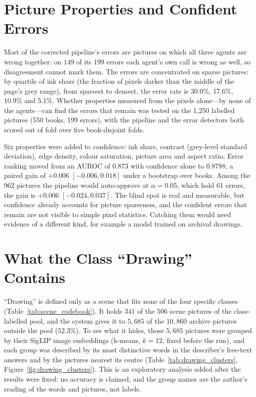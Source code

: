 \section{Picture Properties and Confident Errors}
\label{sec:blind_spot_features}

Most of the corrected pipeline's errors are pictures on which all three agents are wrong together: on $149$ of its $199$ errors each agent's own call is wrong as well, so disagreement cannot mark them. The errors are concentrated on sparse pictures: by quartile of ink share (the fraction of pixels darker than the middle of the page's grey range), from sparsest to densest, the error rate is 30.0\%, 17.6\%, 10.9\% and 5.1\%. Whether properties measured from the pixels alone---by none of the agents---can find the errors that remain was tested on the 1,250 labelled pictures (550 books, 199 errors), with the pipeline and the error detectors both scored out of fold over five book-disjoint folds.

Six properties were added to confidence: ink share, contrast (grey-level standard deviation), edge density, colour saturation, picture area and aspect ratio. Error ranking moved from an AUROC of $0.873$ with confidence alone to $0.8788$, a paired gain of $+0.006$ $[-0.006, 0.018]$ under a bootstrap over books. Among the 962 pictures the pipeline would auto-approve at $\alpha = 0.05$, which hold 61 errors, the gain is $+0.006$ $[-0.024, 0.037]$. The blind spot is real and measurable, but confidence already accounts for picture sparseness, and the confident errors that remain are not visible to simple pixel statistics. Catching them would need evidence of a different kind, for example a model trained on archival drawings.

\section{What the Class ``Drawing'' Contains}
\label{sec:drawing_clusters}
``Drawing'' is defined only as a scene that fits none of the four specific classes (Table~\ref{tab:scene_codebook}). It holds $341$ of the $506$ scene pictures of the class-labelled pool, and the system gives it to $5{,}685$ of the $10{,}860$ archive pictures outside the pool ($52.3\%$). To see what it hides, those $5{,}685$ pictures were grouped by their SigLIP image embeddings (k-means, $k = 12$, fixed before the run), and each group was described by its most distinctive words in the describer's free-text answers and by the pictures nearest its centre (Table~\ref{tab:drawing_clusters}, Figure~\ref{fig:drawing_clusters}). This is an exploratory analysis added after the results were fixed: no accuracy is claimed, and the group names are the author's reading of the words and pictures, not labels.

